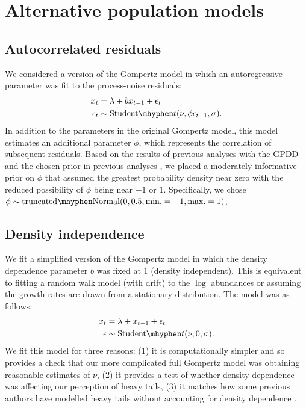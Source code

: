 \documentclass[12pt]{article}
\begin{document}
\section{Alternative population models}

\subsection{Autocorrelated residuals} We considered a version of the Gompertz
model in which an autoregressive parameter was fit to the process-noise
residuals:
\begin{align}
x_t &= \lambda + b x_{t-1} + \epsilon_t\\
\epsilon_t &\sim \mathrm{Student}\mhyphen t(\nu, \phi \epsilon_{t-1}, \sigma).
\end{align}
In addition to the parameters in the original Gompertz model, this model
estimates an additional parameter \(\phi\), which represents the correlation of
subsequent residuals. Based on the results of previous analyses with the
GPDD \cite{connors2014} and the chosen prior in previous
analyses \cite{thorson2014a}, we placed a moderately informative prior on
\(\phi\) that assumed the greatest probability density near zero with the
reduced possibility of \(\phi\) being near \(-1\) or \(1\). Specifically, we
chose \(\phi \sim \mathrm{truncated\mhyphen Normal}(0, 0.5, \mathrm{min.} = -1,
\mathrm{max.} = 1)\).

\subsection{Density independence} We fit a simplified version of the
Gompertz model in which the density dependence parameter \(b\) was fixed at
\(1\) (density independent). This is equivalent to fitting a random walk model
(with drift) to the \(\log\) abundances or assuming the growth rates are drawn
from a stationary distribution. The model was as follows:
\begin{align}
  \label{eq:rw-drift}
x_t &= \lambda + x_{t-1} + \epsilon_t\\
\epsilon &\sim \mathrm{Student}\mhyphen t(\nu, 0, \sigma).
\end{align}
We fit this model for three reasons: (1) it is computationally simpler and so
provides a check that our more complicated full Gompertz model was obtaining
reasonable estimates of \(\nu\), (2) it provides a test of whether density
dependence was affecting our perception of heavy tails, (3) it
matches how some previous authors have modelled heavy tails without accounting
for density dependence \cite{segura2013}.
\end{document}
